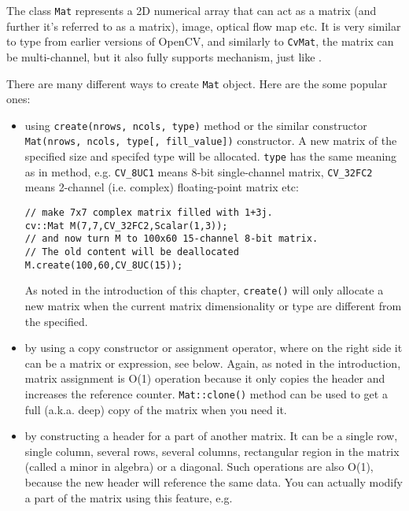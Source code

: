 The class \texttt{Mat} represents a 2D numerical array that can act as a matrix (and further it's referred to as a matrix), image, optical flow map etc. It is very similar to  type from earlier versions of OpenCV, and similarly to \texttt{CvMat}, the matrix can be multi-channel, but it also fully supports  mechanism, just like .

There are many different ways to create \texttt{Mat} object. Here are the some popular ones:
\begin{itemize}
\item using \texttt{create(nrows, ncols, type)} method or
    the similar constructor \texttt{Mat(nrows, ncols, type[, fill\_value])} constructor.
    A new matrix of the specified size and specifed type will be allocated.
    \texttt{type} has the same meaning as in  method,
    e.g. \texttt{CV\_8UC1} means 8-bit single-channel matrix,
    \texttt{CV\_32FC2} means 2-channel (i.e. complex) floating-point matrix etc:
        
\begin{lstlisting}
// make 7x7 complex matrix filled with 1+3j.
cv::Mat M(7,7,CV_32FC2,Scalar(1,3));
// and now turn M to 100x60 15-channel 8-bit matrix.
// The old content will be deallocated
M.create(100,60,CV_8UC(15));
\end{lstlisting}
        
    As noted in the introduction of this chapter, \texttt{create()}
    will only allocate a new matrix when the current matrix dimensionality
    or type are different from the specified.
        
\item by using a copy constructor or assignment operator, where on the right side it can
      be a matrix or expression, see below. Again, as noted in the introduction,
      matrix assignment is O(1) operation because it only copies the header
      and increases the reference counter. \texttt{Mat::clone()} method can be used to get a full
      (a.k.a. deep) copy of the matrix when you need it.
          
\item by constructing a header for a part of another matrix. It can be a single row, single column,
      several rows, several columns, rectangular region in the matrix (called a minor in algebra) or
      a diagonal. Such operations are also O(1), because the new header will reference the same data.
      You can actually modify a part of the matrix using this feature, e.g.
          

\end{itemize}

